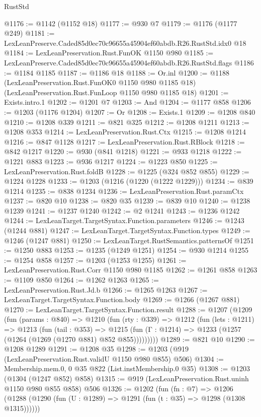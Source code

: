 \begin{lexlean}{RustStd}
\begin{coremodule}
@1176 := @1142 (@1152 @18)
@1177 := @930 @7
@1179 := @1176 (@1177 @249)
@1181 := LexLeanPreserve.Caded85d0ec70c96655a45904ef60abdb.R26.RustStd.idx0 @18
@1184 := LexLeanPreservation.Rust.FunOK @1150 @980
@1185 := LexLeanPreserve.Caded85d0ec70c96655a45904ef60abdb.R26.RustStd.flags
@1186 := @1184 @1185
@1187 := @1186 @18
@1188 := Or.inl
@1200 := @1188
    (LexLeanPreservation.Rust.FunOK0 @1150 @980 @1185 @18)
    (LexLeanPreservation.Rust.FunLoop @1150 @980 @1185 @18)
@1201 := Exists.intro.{1}
@1202 := @1201 @7
@1203 := And
@1204 := @1177 @858
@1206 := @1203 (@1176 @1204)
@1207 := Or
@1208 := Exists.{1}
@1209 := @1208 @840
@1210 := @1208 @339
@1211 := @821 @325
@1212 := @1208 @1211
@1213 := @1208 @353
@1214 := LexLeanPreservation.Rust.Ctx
@1215 := @1208 @1214
@1216 := @847 @1128
@1217 := LexLeanPreservation.Rust.RBlock
@1218 := @842 @1217
@1220 := @930 (@841 @1218)
@1221 := @933 @1218
@1222 := @1221 @883
@1223 := @936 @1217
@1224 := @1223 @850
@1225 := LexLeanPreservation.Rust.foldB
@1228 := @1225 (@324 @852 @855)
@1229 := @1224 @1228
@1233 := @1203 (@1216 (@1220 (@1222 @1229)))
@1234 := @839 @1214
@1235 := @838 @1234
@1236 := LexLeanPreservation.Rust.paramCtx
@1237 := @820 @10
@1238 := @820 @35
@1239 := @839 @10
@1240 := @1238 @1239
@1241 := @1237 @1240
@1242 := @2 @1241
@1243 := @1236 @1242
@1244 := LexLeanTarget.TargetSyntax.Function.parameters
@1246 := @1243 (@1244 @881)
@1247 := LexLeanTarget.TargetSyntax.Function.types
@1249 := @1246 (@1247 @881)
@1250 := LexLeanTarget.RustSemantics.patternsOf
@1251 := @1250 @883
@1253 := @1235 (@1249 @1251)
@1254 := @930 @1214
@1255 := @1254 @858
@1257 := @1203 (@1253 @1255)
@1261 := LexLeanPreservation.Rust.Corr @1150 @980 @1185
@1262 := @1261 @858
@1263 := @1109 @850
@1264 := @1262 @1263
@1265 := LexLeanPreservation.Rust.Jd.b
@1266 := @1265 @1263
@1267 := LexLeanTarget.TargetSyntax.Function.body
@1269 := @1266 (@1267 @881)
@1270 := LexLeanTarget.TargetSyntax.Function.result
@1288 := @1207
    (@1209
      (fun (params : @840) =>
      @1210
        (fun (rty : @339) =>
        @1212
          (fun (lets : @1211) =>
          @1213
            (fun (tail : @353) =>
            @1215 (fun (Γ : @1214) => @1233 (@1257 (@1264 (@1269 (@1270 @881) @852 @855)))))))))
@1289 := @821 @10
@1290 := @1208 @1289
@1291 := @1208 @35
@1298 := @1203 (@919 (LexLeanPreservation.Rust.validU @1150 @980 @855) @506)
@1304 := Membership.mem.{0, 0} @35 @822 (List.instMembership.{0} @35)
@1308 := @1203 (@1304 (@1247 @852) @858)
@1315 := @919 (LexLeanPreservation.Rust.uninh @1150 @980 @855 @858) @506
@1326 := @1202
    (fun (fn : @7) =>
    @1206 (@1288 (@1290 (fun (U : @1289) => @1291 (fun (t : @35) => @1298 (@1308 @1315))))))

\end{coremodule}
\end{lexlean}
